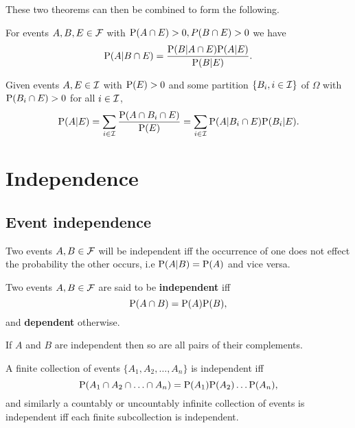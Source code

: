 These two theorems can then be combined to form the following.
\begingroup\belowdisplayskip=-10pt
\begin{theorem}
    For events $A,B,E \in \FFF$ with $\P(A\cap E)>0, P(B\cap E) > 0$ we have \[
    \P(A|B\cap E) = \frac{\P(B|A\cap E)\P(A|E)}{\P(B|E)}
    \textcolor{black}{.}
    \]
\end{theorem}
\endgroup

\begingroup\belowdisplayskip=-10pt
\begin{theorem}
    Given events $A,E\in\III$  with $\P(E)>0$ and some partition $\{B_i, i\in\III\}$ of $\Omega$ with $\P(B_i\cap E)>0$ for all $i\in\III$,
    \[
        \P(A|E)=\sum_{i\in\III}\frac{\P(A\cap B_i\cap E)}{\P(E)}
        =\sum_{i\in\III}\P(A|B_i\cap E)\P(B_i| E)
        \textcolor{black}{.}
    \]
\end{theorem}
\endgroup

\section{Independence}
\subsection{Event independence}
Two events $A,B\in\FFF$ will be independent iff the occurrence of one does not effect the probability the other occurs, i.e $\P(A|B) = \P(A)$ and vice versa.

\begin{definition}
    Two events $A,B \in \FFF$ are said to be \textbf{independent} iff\[
    \P(A\cap B) = \P(A)\P(B) \textcolor{black}{,}
    \] and \textbf{dependent} otherwise.
\end{definition}

\begin{corollary}
    If $A$ and $B$ are independent then so are all pairs of their complements.
\end{corollary}

\begin{definition}
    A finite collection of events $\{A_1,A_2,\ldots ,A_n\}$ is independent iff \[
    \P(A_1\cap A_2\cap \ldots \cap A_n) = \P(A_1)\P(A_2)\ldots \P(A_n)\textcolor{black}{,}
    \]
    and similarly a countably or uncountably infinite collection of events is independent iff each finite subcollection is independent.
\end{definition}

